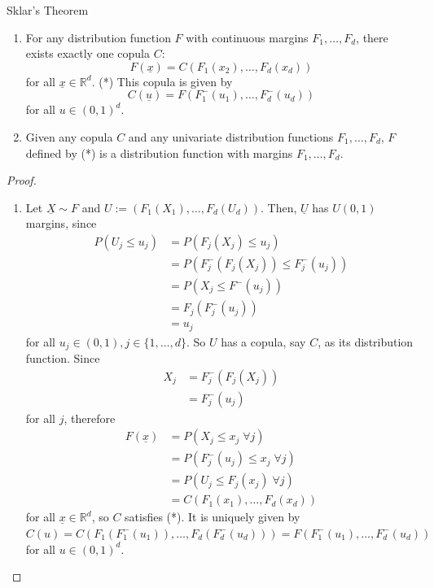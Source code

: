 \documentclass{article}
\newcommand{\R}{\mathbb{R}}
\begin{document}
	\begin{mythm}{Sklar's Theorem}{}
		\begin{enumerate}
			\item For any distribution function $F$ with continuous margins $F_1, \dots, F_d$, there exists exactly one copula $C$: $$F(\underline{x})=C(F_1(x_2), \dots, F_d(x_d))$$ for all $\underline{x}\in\R^d$. (*) This copula is given by $$C(\underline{u})=F(F_1^-(u_1), \dots, F_d^-(u_d))$$ for all $u\in(0, 1)^d$.
			
			\item Given any copula $C$ and any univariate distribution functions $F_1, \dots, F_d$, $F$ defined by (*) is a distribution function with margins $F_1, \dots, F_d$.
		\end{enumerate}
		
		\begin{proof}~
			\begin{enumerate}
				\item Let $\underline{X}\sim F$ and $U:=(F_1(X_1), \dots, F_d(U_d))$. Then, $\underline{U}$ has $U(0, 1)$ margins, since
				\begin{align*}
					P(U_j\leq u_j)&=P(F_j(X_j)\leq u_j)\\
					&=P(F_j^-(F_j(X_j))\leq F_j^-(u_j))\\
					&=P(X_j\leq F^-(u_j))\\
					&=F_j(F_j^-(u_j))\\
					&=u_j
				\end{align*}
				for all $u_j\in(0, 1), j\in\{1, \dots, d\}$. So $U$ has a copula, say $C$, as its distribution function. Since
				\begin{align*}
					X_j&=F_j^-(F_j(X_j))\\
					&=F_j^-(u_j)
				\end{align*}
				for all $j$, therefore
				\begin{align*}
					F(\underline{x})&=P(X_j\leq x_j\;\forall j)\\
					&=P(F_j^-(u_j)\leq x_j\;\forall j)\\
					&=P(U_j\leq F_j(x_j)\;\forall j)\\
					&=C(F_1(x_1), \dots, F_d(x_d))
				\end{align*}
				for all $\underline{x}\in\R^d$, so $C$ satisfies (*). It is uniquely given by $C(u)=C(F_1(F_1^-(u_1)), \dots, F_d(F_d^-(u_d)))=F(F_1^-(u_1), \dots, F_d^-(u_d))$ for all $u\in(0, 1)^d$.
				

\end{enumerate}
\end{proof}
\end{mythm}
\end{document}
